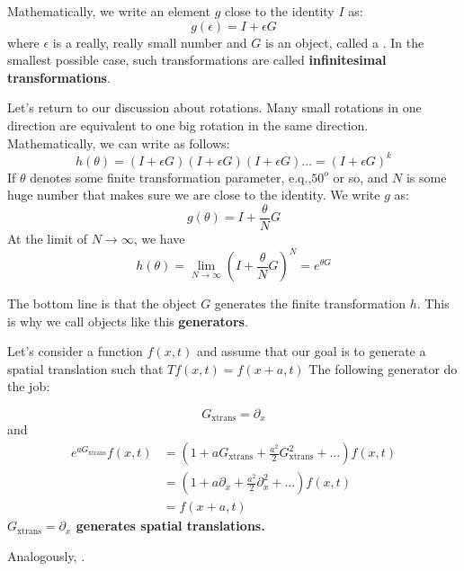 Mathematically, we write an element $g$ close to the identity $I$ as:
\begin{equation}
g(\epsilon)=I+\epsilon G
\end{equation}
where $\epsilon$ is a really, really small number and $G$ is an object, called a . In the smallest possible case, such transformations are called \textbf{infinitesimal transformations}.

Let’s return to our discussion about rotations. Many small rotations in one direction are equivalent to one big rotation in the same direction. Mathematically, we can write  as follows:
\begin{equation}
h(\theta)=(I+\epsilon G)(I+\epsilon G)(I+\epsilon G) \ldots=(I+\epsilon G)^{k}
\end{equation}
If $\theta$ denotes some finite transformation parameter, e.q.,$50^o$ or so, and $N$ is some huge number that makes sure we are close to the identity. We write $g$ as:
$$
g(\theta)=I+\frac{\theta}{N} G
$$
At the limit of $N\rightarrow\infty$, we have 
$$
h(\theta)=\lim _{N \rightarrow \infty}\left(I+\frac{\theta}{N} G\right)^{N}=e^{\theta G}
$$
\begin{qt}
    The bottom line is that the object $G$ generates the finite transformation $h .$ This is why we call objects like this \textbf{generators}.
\end{qt}
Let's consider a function $f(x, t)$ and assume that our goal is to generate a spatial translation such that $T f(x, t)=f(x+a, t)$ The following generator do the job:
\begin{qt}
    \begin{equation}
G_{\mathrm{xtrans}}=\partial_{x}
\end{equation}
and
\begin{equation}
\begin{aligned}
e^{a G_{\mathrm{xtrans}}} f(x, t) &=\left(1+a G_{\mathrm{xtrans}}+\frac{a^{2}}{2} G_{\mathrm{xtrans}}^{2}+\ldots\right) f(x, t) \\
&=\left(1+a \partial_{x}+\frac{a^{2}}{2} \partial_{x}^{2}+\ldots\right) f(x, t) \\
&=f(x+a, t)
\end{aligned}
\end{equation}
\textbf{$G_{\mathrm{xtrans}}=\partial_{x}$ generates spatial translations.}
\end{qt}
Analogously, .

